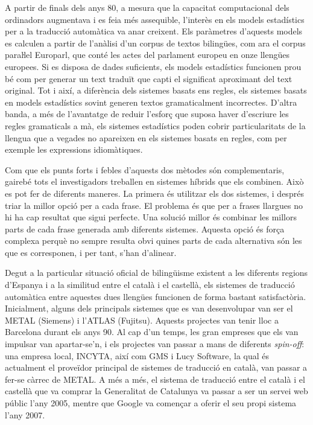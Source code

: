 \begin{multicols}{2}

A partir de finals dels anys 80, a mesura que la capacitat computacional dels ordinadors augmentava i es feia més assequible, l’interès en els models estadístics per a la traducció automàtica va anar creixent. Els paràmetres d’aquests models es calculen a partir de l’anàlisi d’un corpus de textos bilingües, com ara el corpus paraŀlel Europarl, que conté les actes del parlament europeu en onze llengües europees. Si es disposa de dades suficients, els models estadístics funcionen prou bé com per generar un text traduït que capti el significat aproximant del text original. Tot i així, a diferència dels sistemes basats ens regles, els sistemes basats en models estadístics sovint generen textos gramaticalment incorrectes. D’altra banda, a més de l’avantatge de reduir l’esforç que suposa haver d’escriure les regles gramaticals a mà, els sistemes estadístics poden cobrir particularitats de la llengua que a vegades no apareixen en els sistemes basats en regles, com per exemple les expressions idiomàtiques. 

Com que els punts forts i febles d’aquests dos mètodes són complementaris, gairebé tots el investigadors treballen en sistemes híbrids que els combinen. Això es pot fer de diferents maneres. La primera és utilitzar els dos sistemes, i després triar la millor opció per a cada frase. El problema és que per a frases llargues no hi ha cap resultat que sigui perfecte. Una solució millor és combinar les millors parts de cada frase generada amb diferents sistemes. Aquesta opció és força complexa perquè no sempre resulta obvi quines parts de cada alternativa són les que es corresponen, i per tant, s’han d’alinear.

Degut a la particular situació oficial de bilingüisme existent a les diferents regions d’Espanya i a la similitud entre el català i el castellà, els sistemes de traducció automàtica entre aquestes dues llengües funcionen de forma bastant satisfactòria. Inicialment, alguns dels principals sistemes que es van desenvolupar van ser el METAL (Siemens) i l’ATLAS (Fujitsu). Aquests projectes van tenir lloc a Barcelona durant els anys 90. Al cap d’un temps, les gran empreses que els van impulsar van apartar-se’n, i els projectes van passar a mans de diferents \textit{spin-off}: una empresa local, INCYTA, així com GMS i Lucy Software, la qual és actualment el proveïdor principal de sistemes de traducció en català, van passar a fer-se càrrec de METAL. A més a més, el sistema de traducció entre el català i el castellà que va comprar la Generalitat de Catalunya va passar a ser un servei web públic l’any 2005, mentre que Google va començar a oferir el seu propi sistema l’any 2007.


\end{multicols}
